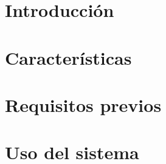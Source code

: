    
\section{Introducción}

\section{Características}

\section{Requisitos previos}

\section {Uso del sistema}

